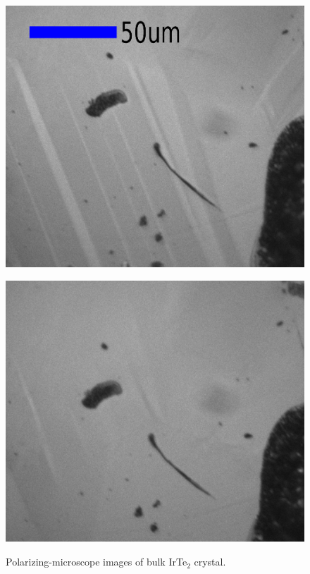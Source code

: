 \documentclass[11pt,a4paper]{article}
\begin{document}
\begin{figure}
  \vspace{-1zh}
 \begin{minipage}{0.48\hsize}
  \begin{center}
   \includegraphics[width=0.95\hsize]{nonpolv250.eps}
  \end{center}
  \label{fig:nonpolv250}
 \end{minipage}
 \begin{minipage}{0.48\hsize}
  \begin{center}
   \includegraphics[width=0.95\hsize]{nonpolv100.eps}
  \end{center}
  \label{fig:nonpolv100}
 \end{minipage}
  \caption{Polarizing-microscope images of bulk IrTe$_2$ crystal.}
\end{figure}
\end{document}
